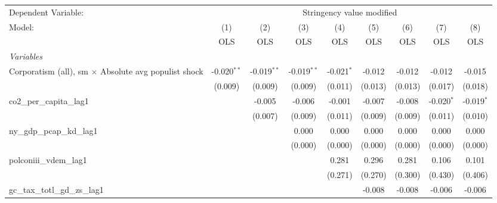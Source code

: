 
\begingroup
\centering
\begin{tabular}{lcccccccc}
   \toprule
   Dependent Variable: & \multicolumn{8}{c}{Stringency value modified}\\
   Model:                                                      & (1)           & (2)           & (3)           & (4)          & (5)     & (6)     & (7)          & (8)\\  
                                                               &  OLS          & OLS           & OLS           & OLS          & OLS     & OLS     & OLS          & OLS\\  
   \midrule
   \emph{Variables}\\
   Corporatism (all), sm $\times$ Absolute avg populist shock  & -0.020$^{**}$ & -0.019$^{**}$ & -0.019$^{**}$ & -0.021$^{*}$ & -0.012  & -0.012  & -0.012       & -0.015\\   
                                                               & (0.009)       & (0.009)       & (0.009)       & (0.011)      & (0.013) & (0.013) & (0.017)      & (0.018)\\   
   co2\_per\_capita\_lag1                                      &               & -0.005        & -0.006        & -0.001       & -0.007  & -0.008  & -0.020$^{*}$ & -0.019$^{*}$\\   
                                                               &               & (0.007)       & (0.009)       & (0.011)      & (0.009) & (0.009) & (0.011)      & (0.010)\\   
   ny\_gdp\_pcap\_kd\_lag1                                     &               &               & 0.000         & 0.000        & 0.000   & 0.000   & 0.000        & 0.000\\   
                                                               &               &               & (0.000)       & (0.000)      & (0.000) & (0.000) & (0.000)      & (0.000)\\   
   polconiii\_vdem\_lag1                                       &               &               &               & 0.281        & 0.296   & 0.281   & 0.106        & 0.101\\   
                                                               &               &               &               & (0.271)      & (0.270) & (0.300) & (0.430)      & (0.406)\\   
   gc\_tax\_totl\_gd\_zs\_lag1                                 &               &               &               &              & -0.008  & -0.008  & -0.006       & -0.006\\   

\end{tabular}
